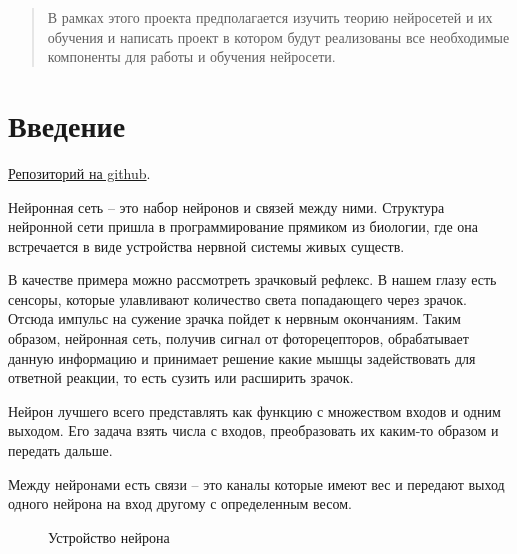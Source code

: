 \documentclass{article}
\begin{document}
\makeTitlePage

\tableofcontents


\newpage

\begin{abstract}
В рамках этого проекта предполагается изучить теорию нейросетей и их обучения и написать проект в котором будут реализованы все необходимые компоненты для работы и обучения нейросети.
\end{abstract}


\section{Введение}
\begin{center}
    \href{https://github.com/toobrainless/NeuralNetwork}{Репозиторий на github}.
\end{center}

Нейронная сеть -- это набор нейронов и связей между ними. Структура нейронной сети пришла в программирование прямиком из биологии, где она встречается в виде устройства нервной системы живых существ.

В качестве примера можно рассмотреть зрачковый рефлекс. В нашем глазу есть сенсоры, которые улавливают количество света попадающего через зрачок. Отсюда импульс на сужение зрачка пойдет к нервным окончаниям. Таким образом, нейронная сеть, получив сигнал от фоторецепторов, обрабатывает данную информацию и принимает решение какие мышцы задействовать для ответной реакции, то есть сузить или расширить зрачок.

Нейрон лучшего всего представлять как функцию с множеством входов и одним выходом. Его задача взять числа с входов, преобразовать их каким-то образом и передать дальше.

Между нейронами есть связи -- это каналы которые имеют вес и передают выход одного нейрона на вход другому с определенным весом.

\begin{figure}[h]
    \caption{Устройство нейрона}
\end{figure}
\end{document}

